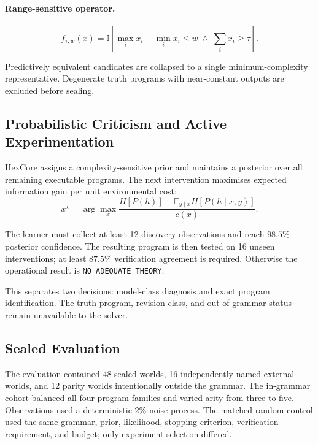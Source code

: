 \paragraph{Range-sensitive operator.}
\begin{equation}
  f_{\tau,w}(x)=
  \mathbb{I}\!\left[
    \max_i x_i-\min_i x_i\leq w
    \;\land\;
    \sum_i x_i\geq\tau
  \right].
\end{equation}

Predictively equivalent candidates are collapsed to a single
minimum-complexity representative. Degenerate truth programs with near-constant
outputs are excluded before sealing.

\subsection{Probabilistic Criticism and Active Experimentation}

HexCore assigns a complexity-sensitive prior and maintains a posterior over all
remaining executable programs. The next intervention maximises expected
information gain per unit environmental cost:
\begin{equation}
  x^\star=\arg\max_x
  \frac{
    H[P(h)]-\mathbb{E}_{y\mid x}H[P(h\mid x,y)]
  }{c(x)}.
\end{equation}

The learner must collect at least 12 discovery observations and reach $98.5\%$
posterior confidence. The resulting program is then tested on 16 unseen
interventions; at least $87.5\%$ verification agreement is required. Otherwise
the operational result is \texttt{NO\_ADEQUATE\_THEORY}.

This separates two decisions: model-class diagnosis and exact program
identification. The truth program, revision class, and out-of-grammar status
remain unavailable to the solver.

\subsection{Sealed Evaluation}

The evaluation contained 48 sealed worlds, 16 independently named external
worlds, and 12 parity worlds intentionally outside the grammar. The in-grammar
cohort balanced all four program families and varied arity from three to five.
Observations used a deterministic $2\%$ noise process. The matched random
control used the same grammar, prior, likelihood, stopping criterion,
verification requirement, and budget; only experiment selection differed.

